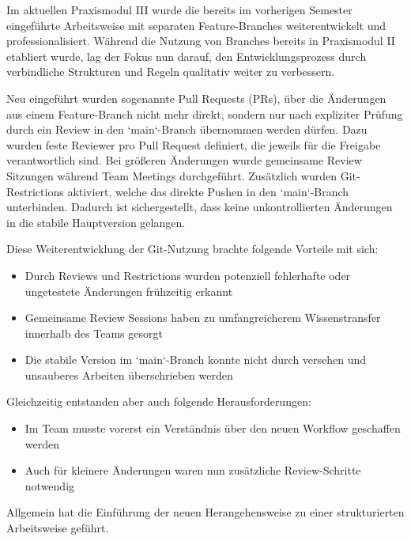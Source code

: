 Im aktuellen Praxismodul III wurde die bereits im vorherigen Semester eingeführte Arbeitsweise mit separaten Feature-Branches weiterentwickelt und professionalisiert.
Während die Nutzung von Branches bereits in Praxismodul II etabliert wurde, lag der Fokus nun darauf, den Entwicklungsprozess durch verbindliche Strukturen und Regeln qualitativ weiter zu verbessern.

Neu eingeführt wurden sogenannte Pull Requests (PRs), über die Änderungen aus einem Feature-Branch nicht mehr direkt, sondern nur nach expliziter Prüfung durch ein Review in den `main`-Branch übernommen werden dürfen.
Dazu wurden feste Reviewer pro Pull Request definiert, die jeweils für die Freigabe verantwortlich sind.
Bei größeren Änderungen wurde gemeinsame Review Sitzungen während Team Meetings durchgeführt.
Zusätzlich wurden Git-Restrictions aktiviert, welche das direkte Pushen in den `main`-Branch unterbinden.
Dadurch ist sichergestellt, dass keine unkontrollierten Änderungen in die stabile Hauptversion gelangen.

Diese Weiterentwicklung der Git-Nutzung brachte folgende Vorteile mit sich:
\begin{itemize}
    \item Durch Reviews und Restrictions wurden potenziell fehlerhafte oder ungetestete Änderungen frühzeitig erkannt
    \item Gemeinsame Review Sessions haben zu umfangreicherem Wissenstransfer innerhalb des Teams gesorgt
    \item Die stabile Version im `main`-Branch konnte nicht durch versehen und unsauberes Arbeiten überschrieben werden
\end{itemize}

Gleichzeitig entstanden aber auch folgende Herausforderungen:
\begin{itemize}
    \item Im Team musste vorerst ein Verständnis über den neuen Workflow geschaffen werden
    \item Auch für kleinere Änderungen waren nun zusätzliche Review-Schritte notwendig
\end{itemize}

Allgemein hat die Einführung der neuen Herangehensweise zu einer strukturierten Arbeitsweise geführt.

